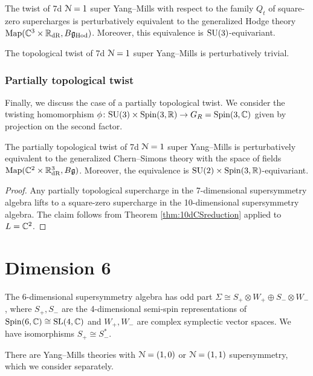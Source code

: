 \documentclass[10pt, oneside]{article}
\newcommand{\Hod}{\mathrm{Hod}}
\begin{document}
\begin{theorem}
The twist of 7d $\mathcal N=1$ super Yang--Mills with respect to the family $Q_t$ of square-zero supercharges is perturbatively equivalent to the generalized Hodge theory $\map(\CC^3\times \RR_{\mr{dR}}, B\fg_{\Hod})$. Moreover, this equivalence is $\mathrm{SU}(3)$-equivariant.
\label{thm:7dHodgetwist}
\end{theorem}

\begin{corollary}
The topological twist of 7d $\mathcal N=1$ super Yang--Mills is perturbatively trivial.
\end{corollary}

\subsubsection{Partially topological twist}
\label{sect:7dpartialtwist}

Finally, we discuss the case of a partially topological twist. We consider the twisting homomorphism $\phi\colon \mathrm{SU}(3)\times \mathrm{Spin}(3, \mathbb R)\rightarrow G_R=\mathrm{Spin}(3, \mathbb C)$ given by projection on the second factor.

\begin{theorem}
The partially topological twist of 7d $\mathcal N=1$ super Yang--Mills is perturbatively equivalent to the generalized Chern--Simons theory with the space of fields $\operatorname{Map}(\mathbb C^2\times \mathbb R^3_{\mathrm{dR}}, B\mathfrak g)$. Moreover, the equivalence is $\mathrm{SU}(2)\times \mathrm{Spin}(3, \mathbb R)$-equivariant.
\label{thm:7dpartiallytopologicaltwist}
\end{theorem}
\begin{proof}
Any partially topological supercharge in the 7-dimensional supersymmetry algebra lifts to a square-zero supercharge in the 10-dimensional supersymmetry algebra. The claim follows from Theorem \ref{thm:10dCSreduction} applied to $L=\mathbb C^2$.
\end{proof}

\section{Dimension 6}

The 6-dimensional supersymmetry algebra has odd part $\Sigma\cong S_+\otimes W_+\oplus S_-\otimes W_-$, where $S_+, S_-$ are the 4-dimensional semi-spin representations of $\mathrm{Spin}(6, \mathbb C)\cong \mathrm{SL}(4, \mathbb C)$ and $W_+, W_-$ are complex symplectic vector spaces. We have isomorphisms $S_+\cong S_-^*$.

There are Yang--Mills theories with $\mathcal N=(1, 0)$ or $\mathcal N=(1, 1)$ supersymmetry, which we consider separately.
\end{document}
